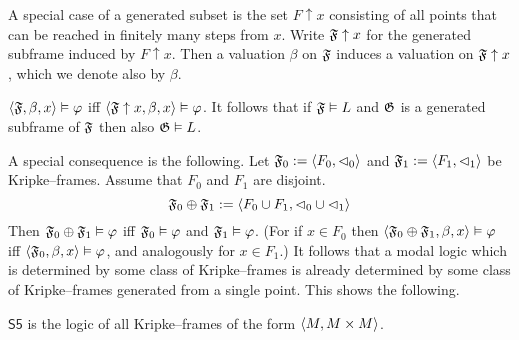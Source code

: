 A special case of a generated subset is the set $F \uparrow x$
consisting of all points that can be reached in finitely many
steps from $x$. Write $\mathfrak{F} \uparrow x$ for the generated subframe
induced by $F \uparrow x$. Then a valuation $\beta$ on $\mathfrak{F}$
induces a valuation on $\mathfrak{F}\uparrow x$, which we denote also
by $\beta$.
\begin{lem}
\label{lem:gensub}
$\langle \mathfrak{F}, \beta, x\rangle \vDash \varphi$ iff
$\langle \mathfrak{F}\uparrow x, \beta, x\rangle \vDash \varphi$. It follows
that if $\mathfrak{F} \vDash L$ and $\mathfrak{G}$ is a generated subframe
of $\mathfrak{F}$ then also $\mathfrak{G} \vDash L$.
\end{lem}
A special consequence is the following. Let $\mathfrak{F}_0 :=
\langle F_0, \lhd_0\rangle$ and $\mathfrak{F}_1 := \langle F_1, \lhd_1\rangle$
be Kripke--frames. Assume that $F_0$ and $F_1$ are disjoint.
\begin{equation}
\mathfrak{F}_0 \oplus \mathfrak{F}_1 := \langle F_0 \cup F_1, \lhd_0 \cup \lhd_1\rangle
\end{equation}
Then $\mathfrak{F}_0 \oplus \mathfrak{F}_1 \vDash \varphi$ iff $\mathfrak{F}_0 \vDash \varphi$ 
and $\mathfrak{F}_1 \vDash \varphi$. (For if $x \in F_0$ then 
$\langle \mathfrak{F}_0 \oplus \mathfrak{F}_1, \beta, x\rangle\vDash \varphi$ iff $\langle \mathfrak{F}_0,
\beta, x\rangle \vDash \varphi$, and analogously for $x \in F_1$.)
It follows that a modal logic which is determined by some class of
Kripke--frames is already determined by some class of Kripke--frames 
generated from a single point. This shows the following.
\begin{thm}
$\mathsf{S5}$ is the logic of all Kripke--frames of the form
$\langle M, M\times M\rangle$.
\end{thm}

